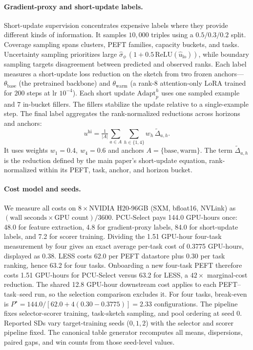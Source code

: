 \paragraph{Gradient-proxy and short-update labels.}
Short-update supervision concentrates expensive labels where they provide
different kinds of information. It samples $10{,}000$ triples using a
$0.5/0.3/0.2$ split. Coverage sampling spans clusters, PEFT families, capacity
buckets, and tasks. Uncertainty sampling prioritizes large
$\widehat{\sigma}_{\phi}\,(1+0.5\,\mathrm{ReLU}(\hat{u}_{\text{lo}}))$, while boundary
sampling targets disagreement between predicted and observed ranks. Each label
measures a short-update loss reduction on the sketch from two frozen anchors---$\theta_{\text{base}}$
(the pretrained backbone) and $\theta_{\text{warm}}$ (a rank-8 attention-only LoRA
trained for $200$ steps at lr $10^{-4}$). Each short update
$\mathrm{Adapt}^{h}_{p}$ uses one sampled example and $7$ in-bucket fillers.
The fillers stabilize the update relative to a single-example step. The
final label aggregates the rank-normalized reductions across horizons and anchors:
\begin{equation}
\label{eq:uhi-offline}
  u^{\mathrm{hi}}=\tfrac{1}{|A|}\sum_{a\in A}\sum_{h\in\{1,4\}} w_h\,
  \widetilde{\Delta}_{a,h}.
\end{equation}
It uses weights $w_1{=}0.4,\ w_4{=}0.6$ and anchors
$A=\{\text{base},\text{warm}\}$. The term $\widetilde{\Delta}_{a,h}$ is the
reduction defined by the main paper's short-update equation, rank-normalized within its PEFT, task,
anchor, and horizon bucket.

\paragraph{Cost model and seeds.}
We measure all costs on $8{\times}$NVIDIA H20-96GB (SXM, bfloat16, NVLink)
as $(\text{wall seconds} \times \text{GPU count}) / 3600$. PCU-Select pays
144.0 GPU-hours once: 48.0 for feature extraction, 4.8 for gradient-proxy
labels, 84.0 for short-update labels, and 7.2 for scorer training. Dividing the
1.51 GPU-hour four-task measurement by four gives an exact average per-task cost
of 0.3775 GPU-hours, displayed as 0.38. LESS costs
62.0 per PEFT datastore plus 0.30 per task ranking, hence 63.2 for four tasks.
Onboarding a new four-task PEFT therefore costs 1.51 GPU-hours for PCU-Select
versus 63.2 for LESS, a $42\times$ marginal-cost reduction. The shared 12.8
GPU-hour downstream cost applies to each PEFT--task--seed run, so the selection
comparison excludes it. For four tasks, break-even is
$P^\star=144.0/[62.0+4(0.30-0.3775)]=2.33$ configurations.
The pipeline fixes selector-scorer training, task-sketch sampling, and pool
ordering at seed 0. Reported SDs vary target-training seeds ($0,1,2$) with the
selector and scorer pipeline fixed. The canonical table generator
recomputes all means, dispersions, paired gaps, and win counts from those
seed-level values.

